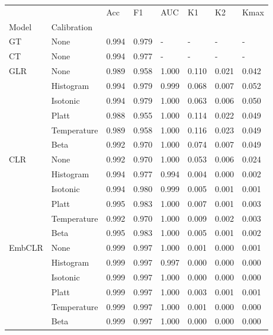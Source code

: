 \begin{tabular}{llllllll}
\toprule
 &  & Acc & F1 & AUC & K1 & K2 & Kmax \\
Model & Calibration &  &  &  &  &  &  \\
\midrule
GT & None & 0.994 & 0.979 & - & - & - & - \\
\cline{1-8}
CT & None & 0.994 & 0.977 & - & - & - & - \\
\cline{1-8}
\multirow[t]{6}{*}{GLR} & None & 0.989 & 0.958 & 1.000 & 0.110 & 0.021 & 0.042 \\
 & Histogram & 0.994 & 0.979 & 0.999 & 0.068 & 0.007 & 0.052 \\
 & Isotonic & 0.994 & 0.979 & 1.000 & 0.063 & 0.006 & 0.050 \\
 & Platt & 0.988 & 0.955 & 1.000 & 0.114 & 0.022 & 0.049 \\
 & Temperature & 0.989 & 0.958 & 1.000 & 0.116 & 0.023 & 0.049 \\
 & Beta & 0.992 & 0.970 & 1.000 & 0.074 & 0.007 & 0.049 \\
\cline{1-8}
\multirow[t]{6}{*}{CLR} & None & 0.992 & 0.970 & 1.000 & 0.053 & 0.006 & 0.024 \\
 & Histogram & 0.994 & 0.977 & 0.994 & 0.004 & 0.000 & 0.002 \\
 & Isotonic & 0.994 & 0.980 & 0.999 & 0.005 & 0.001 & 0.001 \\
 & Platt & 0.995 & 0.983 & 1.000 & 0.007 & 0.001 & 0.003 \\
 & Temperature & 0.992 & 0.970 & 1.000 & 0.009 & 0.002 & 0.003 \\
 & Beta & 0.995 & 0.983 & 1.000 & 0.005 & 0.001 & 0.002 \\
\cline{1-8}
\multirow[t]{6}{*}{EmbCLR} & None & 0.999 & 0.997 & 1.000 & 0.001 & 0.000 & 0.001 \\
 & Histogram & 0.999 & 0.997 & 0.997 & 0.000 & 0.000 & 0.000 \\
 & Isotonic & 0.999 & 0.997 & 1.000 & 0.000 & 0.000 & 0.000 \\
 & Platt & 0.999 & 0.997 & 1.000 & 0.003 & 0.001 & 0.001 \\
 & Temperature & 0.999 & 0.997 & 1.000 & 0.001 & 0.000 & 0.000 \\
 & Beta & 0.999 & 0.997 & 1.000 & 0.000 & 0.000 & 0.000 \\
\cline{1-8}
\bottomrule
\end{tabular}
